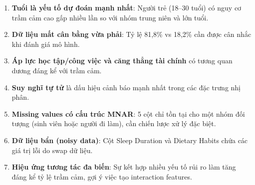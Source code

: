 \begin{enumerate}[noitemsep]
    \item \textbf{Tuổi là yếu tố dự đoán mạnh nhất}: Người trẻ (18--30 tuổi) có nguy cơ trầm cảm cao gấp nhiều lần so với nhóm trung niên và lớn tuổi.
    \item \textbf{Dữ liệu mất cân bằng vừa phải}: Tỷ lệ 81,8\% vs 18,2\% cần được cân nhắc khi đánh giá mô hình.
    \item \textbf{Áp lực học tập/công việc và căng thẳng tài chính} có tương quan dương đáng kể với trầm cảm.
    \item \textbf{Suy nghĩ tự tử} là dấu hiệu cảnh báo mạnh nhất trong các đặc trưng nhị phân.
    \item \textbf{Missing values có cấu trúc MNAR}: 5 cột chỉ tồn tại cho một nhóm đối tượng (sinh viên hoặc người đi làm), cần chiến lược xử lý đặc biệt.
    \item \textbf{Dữ liệu bẩn (noisy data)}: Cột Sleep Duration và Dietary Habits chứa các giá trị lỗi do swap dữ liệu.
    \item \textbf{Hiệu ứng tương tác đa biến}: Sự kết hợp nhiều yếu tố rủi ro làm tăng đáng kể tỷ lệ trầm cảm, gợi ý việc tạo interaction features.
\end{enumerate}
